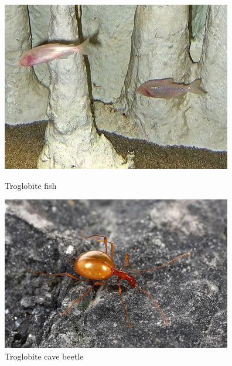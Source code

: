 \documentclass[draft, final]{report}
\begin{document}
\begin{figure}[H]
    \begin{minipage}[c]{.46\linewidth}
        \centering
        \includegraphics[scale=0.6]{LateX/Images/cavefish.png}
        \caption{Troglobite fish \cite{cavebeetle}}
    \end{minipage}
    \hfill%
    \begin{minipage}[c]{.46\linewidth}
        \centering
        \includegraphics[scale=0.6]{LateX/Images/cavebeetle.png}
        \caption{Troglobite cave beetle \cite{cavefish}}
    \end{minipage}
\end{figure}
\end{document}
